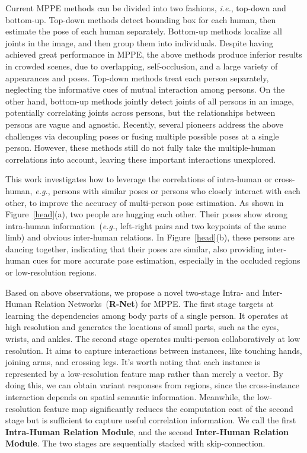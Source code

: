 \documentclass{article}
\begin{document}
Current MPPE methods can be divided into two fashions, \emph{i.e.}, top-down and bottom-up. Top-down methods \cite{he2017mask,xiao2018simple,fang2017rmpe,sun2019deep,chen2018cascaded} detect bounding box for each human, then estimate the pose of each human separately. Bottom-up methods \cite{cao2019openpose,newell2016associative,cheng2020higherhrnet,papandreou2018personlab,jin2020differentiable} localize all joints in the image, and then group them into individuals.
Despite having achieved great performance in MPPE, the above methods produce inferior results in crowded scenes, due to overlapping, self-occlusion, and a large variety of appearances and poses. Top-down methods treat each person separately, neglecting the informative cues of mutual interaction among persons. On the other hand, bottom-up methods jointly detect joints of all persons in an image, potentially correlating joints across persons, but the relationships between persons are vague and agnostic. Recently, several pioneers address the above challenges via decoupling poses \cite{li2019crowdpose,qiu2020peeking} or fusing multiple possible poses \cite{wang2021robust} at a single person. However, these methods still do not fully take the multiple-human correlations into account, leaving these important interactions unexplored.

This work investigates how to leverage the correlations of intra-human or cross-human, \emph{e.g.}, persons with similar poses or persons who closely interact with each other, to improve the accuracy of multi-person pose estimation. As shown in Figure~\ref{head}(a), two people are hugging each other. Their poses show strong intra-human information~(\emph{e.g.}, left-right pairs and two keypoints of the same limb) and obvious inter-human relations. In  Figure~\ref{head}(b), these persons are dancing together, indicating that their poses are similar, also providing inter-human cues for more accurate pose estimation, especially in the occluded regions or low-resolution regions. 




Based on above observations, we propose a novel two-stage Intra- and Inter-Human Relation Networks~(\textbf{R-Net}) for MPPE. The first stage targets at learning the dependencies among body parts of a single person. It operates at high resolution and generates the locations of small parts, such as the eyes, wrists, and ankles. The second stage operates multi-person collaboratively at low resolution. It aims to capture interactions between instances, like touching hands, joining arms, and crossing legs. It's worth noting that each instance is represented by a low-resolution feature map rather than merely a vector. By doing this, we can obtain variant responses from regions, since the cross-instance interaction depends on spatial semantic information. Meanwhile, the low-resolution feature map significantly reduces the computation cost of the second stage but is sufficient to capture useful correlation information. 
We call the first \textbf{Intra-Human Relation Module}, and the second \textbf{Inter-Human Relation Module}. The two stages are sequentially stacked with skip-connection.
\end{document}
